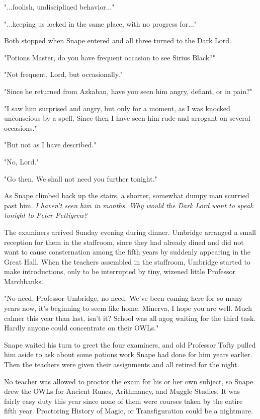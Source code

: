 \documentclass[a4paper,11pt]{article}
\begin{document}
"...foolish, undisciplined behavior..."

"...keeping us locked in the same place, with no progress for..."

Both stopped when Snape entered and all three turned to the Dark Lord.

"Potions Master, do you have frequent occasion to see Sirius Black?"

"Not frequent, Lord, but occasionally."

"Since he returned from Azkaban, have you seen him angry, defiant, or in pain?"

"I saw him surprised and angry, but only for a moment, as I was knocked unconscious by a spell. Since then I have seen him rude and arrogant on several occasions."

"But not as I have described."

"No, Lord."

"Go then. We shall not need you further tonight."

As Snape climbed back up the stairs, a shorter, somewhat dumpy man scurried past him. \emph{I haven't seen him in months. Why would the Dark Lord want to speak tonight to Peter Pettigrew?}

The examiners arrived Sunday evening during dinner. Umbridge arranged a small reception for them in the staffroom, since they had already dined and did not want to cause consternation among the fifth years by suddenly appearing in the Great Hall. When the teachers assembled in the staffroom, Umbridge started to make introductions, only to be interrupted by tiny, wizened little Professor Marchbanks.

"No need, Professor Umbridge, no need. We've been coming here for so many years now, it's beginning to seem like home. Minerva, I hope you are well. Much calmer this year than last, isn't it? School was all agog waiting for the third task. Hardly anyone could concentrate on their OWLs."

Snape waited his turn to greet the four examiners, and old Professor Tofty pulled him aside to ask about some potions work Snape had done for him years earlier. Then the teachers were given their assignments and all retired for the night.

No teacher was allowed to proctor the exam for his or her own subject, so Snape drew the OWLs for Ancient Runes, Arithmancy, and Muggle Studies. It was fairly easy duty this year since none of them were courses taken by the entire fifth year. Proctoring History of Magic, or Transfiguration could be a nightmare.
\end{document}
